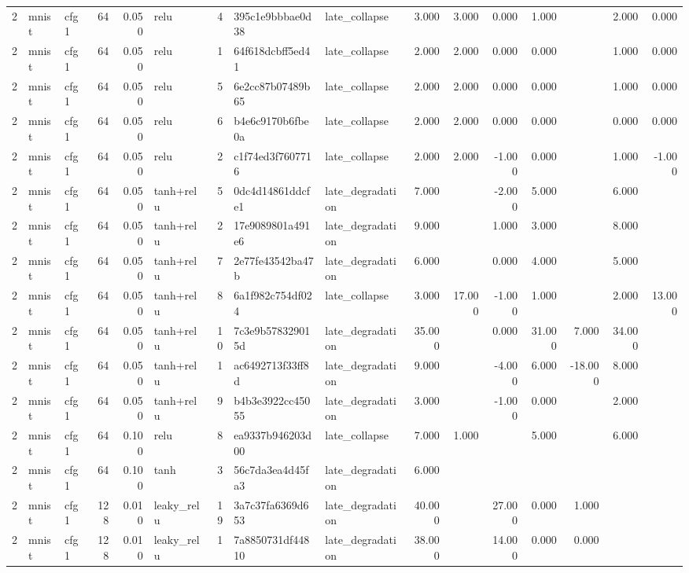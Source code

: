 \begin{table}[htbp]
{\begin{tabular}{@{}rllrrlrllrrrrrrr@{}}
2 & mnist & cfg1 & 64 & 0.050 & relu & 4 & 395c1e9bbbae0d38 & late\_collapse & 3.000 & 3.000 & 0.000 & 1.000 &  & 2.000 & 0.000 \\
2 & mnist & cfg1 & 64 & 0.050 & relu & 1 & 64f618dcbff5ed41 & late\_collapse & 2.000 & 2.000 & 0.000 & 0.000 &  & 1.000 & 0.000 \\
2 & mnist & cfg1 & 64 & 0.050 & relu & 5 & 6e2cc87b07489b65 & late\_collapse & 2.000 & 2.000 & 0.000 & 0.000 &  & 1.000 & 0.000 \\
2 & mnist & cfg1 & 64 & 0.050 & relu & 6 & b4e6c9170b6fbe0a & late\_collapse & 2.000 & 2.000 & 0.000 & 0.000 &  & 0.000 & 0.000 \\
2 & mnist & cfg1 & 64 & 0.050 & relu & 2 & c1f74ed3f7607716 & late\_collapse & 2.000 & 2.000 & -1.000 & 0.000 &  & 1.000 & -1.000 \\
2 & mnist & cfg1 & 64 & 0.050 & tanh+relu & 5 & 0dc4d14861ddcfe1 & late\_degradation & 7.000 &  & -2.000 & 5.000 &  & 6.000 &  \\
2 & mnist & cfg1 & 64 & 0.050 & tanh+relu & 2 & 17e9089801a491e6 & late\_degradation & 9.000 &  & 1.000 & 3.000 &  & 8.000 &  \\
2 & mnist & cfg1 & 64 & 0.050 & tanh+relu & 7 & 2e77fe43542ba47b & late\_degradation & 6.000 &  & 0.000 & 4.000 &  & 5.000 &  \\
2 & mnist & cfg1 & 64 & 0.050 & tanh+relu & 8 & 6a1f982c754df024 & late\_collapse & 3.000 & 17.000 & -1.000 & 1.000 &  & 2.000 & 13.000 \\
2 & mnist & cfg1 & 64 & 0.050 & tanh+relu & 10 & 7c3e9b578329015d & late\_degradation & 35.000 &  & 0.000 & 31.000 & 7.000 & 34.000 &  \\
2 & mnist & cfg1 & 64 & 0.050 & tanh+relu & 1 & ac6492713f33ff8d & late\_degradation & 9.000 &  & -4.000 & 6.000 & -18.000 & 8.000 &  \\
2 & mnist & cfg1 & 64 & 0.050 & tanh+relu & 9 & b4b3e3922cc45055 & late\_degradation & 3.000 &  & -1.000 & 0.000 &  & 2.000 &  \\
2 & mnist & cfg1 & 64 & 0.100 & relu & 8 & ea9337b946203d00 & late\_collapse & 7.000 & 1.000 &  & 5.000 &  & 6.000 &  \\
2 & mnist & cfg1 & 64 & 0.100 & tanh & 3 & 56c7da3ea4d45fa3 & late\_degradation & 6.000 &  &  &  &  &  &  \\
2 & mnist & cfg1 & 128 & 0.010 & leaky\_relu & 19 & 3a7c37fa6369d653 & late\_degradation & 40.000 &  & 27.000 & 0.000 & 1.000 &  &  \\
2 & mnist & cfg1 & 128 & 0.010 & leaky\_relu & 1 & 7a8850731df44810 & late\_degradation & 38.000 &  & 14.000 & 0.000 & 0.000 &  &  \\

\end{tabular}}
\end{table}
